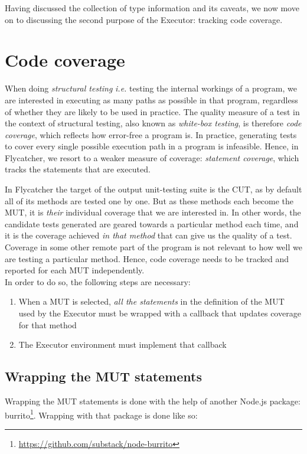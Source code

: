 Having discussed the collection of type information and its caveats, we now move on to discussing the second purpose of the \textsf{Executor}: tracking code coverage.

\section{Code coverage}

When doing \emph{structural testing} \emph{i.e.} testing the internal workings of a program, we are interested in executing as many paths as possible in that program, regardless of whether they are likely to be used in practice. The quality measure of a test in the context of structural testing, also known as \emph{white-box testing}, is therefore \emph{code coverage}, which reflects how error-free a program is. In practice, generating tests to cover every single possible execution path in a program is infeasible. Hence, in \textsf{Flycatcher}, we resort to a weaker measure of coverage: \emph{statement coverage}, which tracks the statements that are executed.

In \textsf{Flycatcher} the target of the output unit-testing suite is the CUT, as by default all of its methods are tested one by one. But as these methods each become the MUT, it is \emph{their} individual coverage that we are interested in. In other words, the candidate tests generated are geared towards a particular method each time, and it is the coverage achieved \emph{in that method} that can give us the quality of a test. Coverage in some other remote part of the program is not relevant to how well we are testing a particular method. Hence, code coverage needs to be tracked and reported for each MUT independently.\\

In order to do so, the following steps are necessary:
\begin{enumerate}
   \item When a MUT is selected, \emph{all the statements} in the definition of the MUT used by the \textsf{Executor} must be wrapped with a callback that updates coverage for that method
   \item The \textsf{Executor} environment must implement that callback
\end{enumerate}

\subsection{Wrapping the MUT statements}
Wrapping the MUT statements is done with the help of another \textsf{Node.js} package: \textsf{burrito}\footnote{\url{https://github.com/substack/node-burrito}}. Wrapping with that package is done like so:

